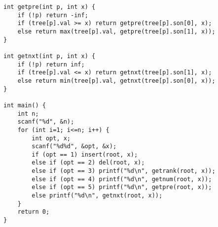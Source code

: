 \begin{lstlisting}
int getpre(int p, int x) {
	if (!p) return -inf;
	if (tree[p].val >= x) return getpre(tree[p].son[0], x);
	else return max(tree[p].val, getpre(tree[p].son[1], x));
}

int getnxt(int p, int x) {
	if (!p) return inf;
	if (tree[p].val <= x) return getnxt(tree[p].son[1], x);
	else return min(tree[p].val, getnxt(tree[p].son[0], x));
}

int main() {
	int n;
	scanf("%d", &n);
	for (int i=1; i<=n; i++) {
		int opt, x;
		scanf("%d%d", &opt, &x);
		if (opt == 1) insert(root, x);
		else if (opt == 2) del(root, x);
		else if (opt == 3) printf("%d\n", getrank(root, x));
		else if (opt == 4) printf("%d\n", getnum(root, x));
		else if (opt == 5) printf("%d\n", getpre(root, x));
		else printf("%d\n", getnxt(root, x));
	}
	return 0;
}
\end{lstlisting}

